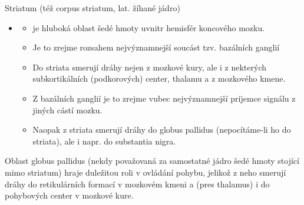 \documentclass[journal,onecolumn]{IEEEtrancz}
\begin{document}
Striatum (též corpus striatum, lat. žíhané jádro) 
\begin{itemize}
	\item 
	\begin{itemize}
		\item je hluboká oblast šedé hmoty uvnitr hemisfér koncového mozku. 
		\item Je to zrejme rozsahem nejvýznamnejší soucást tzv. bazálních ganglií
			\vspace{3mm}
		\item Do striata smerují dráhy nejen z mozkové kury, ale i z nekterých subkortikálních (podkorových) center, thalamu a z mozkového kmene. 
		\item Z bazálních ganglií je to zrejme vubec nejvýznamnejší príjemce signálu z jiných cástí mozku. 
		\item Naopak z striata smerují dráhy do globus pallidus (nepocítáme-li ho do striata), ale i napr. do substantia nigra.
			\vspace{3mm}
	\end{itemize}
\end{itemize}
Oblast globus pallidus (nekdy považovaná za samostatné jádro šedé hmoty stojící mimo striatum) hraje duležitou roli v ovládání pohybu, jelikož z neho smerují dráhy do retikulárních formací v mozkovém kmeni a (pres thalamus) i do pohybových center v mozkové kure. 
\end{document}
